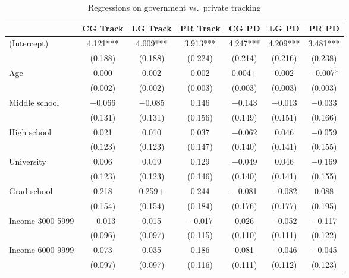 \documentclass[
  letterpaper,
  DIV=11,
  numbers=noendperiod]{scrartcl}
\begin{document}
\hypertarget{tbl-trackingreg}{}
\begin{table}
\caption{\label{tbl-trackingreg}Regressions on government vs.~private tracking }\tabularnewline

\centering
\begin{tabular}[t]{lcccccc}
\toprule
  & CG Track & LG Track & PR Track & CG PD & LG PD & PR PD\\
\midrule
(Intercept) & \num{4.121}*** & \num{4.009}*** & \num{3.913}*** & \num{4.247}*** & \num{4.209}*** & \num{3.481}***\\
 & (\num{0.188}) & (\num{0.188}) & (\num{0.224}) & (\num{0.214}) & (\num{0.216}) & (\num{0.238})\\
Age & \num{0.000} & \num{0.002} & \num{0.002} & \num{0.004}+ & \num{0.002} & \num{-0.007}*\\
 & (\num{0.002}) & (\num{0.002}) & (\num{0.003}) & (\num{0.003}) & (\num{0.003}) & (\num{0.003})\\
Middle school & \num{-0.066} & \num{-0.085} & \num{0.146} & \num{-0.143} & \num{-0.013} & \num{-0.033}\\
 & (\num{0.131}) & (\num{0.131}) & (\num{0.156}) & (\num{0.149}) & (\num{0.151}) & (\num{0.166})\\
High school & \num{0.021} & \num{0.010} & \num{0.037} & \num{-0.062} & \num{0.046} & \num{-0.059}\\
 & (\num{0.123}) & (\num{0.123}) & (\num{0.147}) & (\num{0.140}) & (\num{0.141}) & (\num{0.155})\\
University & \num{0.006} & \num{0.019} & \num{0.129} & \num{-0.049} & \num{0.046} & \num{-0.169}\\
 & (\num{0.123}) & (\num{0.123}) & (\num{0.146}) & (\num{0.140}) & (\num{0.141}) & (\num{0.155})\\
Grad school & \num{0.218} & \num{0.259}+ & \num{0.244} & \num{-0.081} & \num{-0.082} & \num{0.088}\\
 & (\num{0.154}) & (\num{0.154}) & (\num{0.184}) & (\num{0.176}) & (\num{0.177}) & (\num{0.195})\\
Income 3000-5999 & \num{-0.013} & \num{0.015} & \num{-0.017} & \num{0.026} & \num{-0.052} & \num{-0.117}\\
 & (\num{0.096}) & (\num{0.097}) & (\num{0.115}) & (\num{0.110}) & (\num{0.111}) & (\num{0.122})\\
Income 6000-9999 & \num{0.073} & \num{0.035} & \num{0.186} & \num{0.081} & \num{-0.046} & \num{-0.045}\\
 & (\num{0.097}) & (\num{0.097}) & (\num{0.116}) & (\num{0.111}) & (\num{0.112}) & (\num{0.123})\\

\end{tabular}
\end{table}
\end{document}
